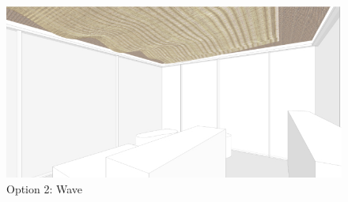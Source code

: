 ﻿%
\begin{figure}[H]
	\centering
	\includegraphics[width=\linewidth]{src/graphics/rattan-charm--pattern-generation-opt-02-wave-perspective.jpg}
	\caption*{%
		Option 2: Wave
	}
	\label{
		fig:rattan-charm--pattern-generation-opt-02-wave-perspective
	}
\end{figure}
